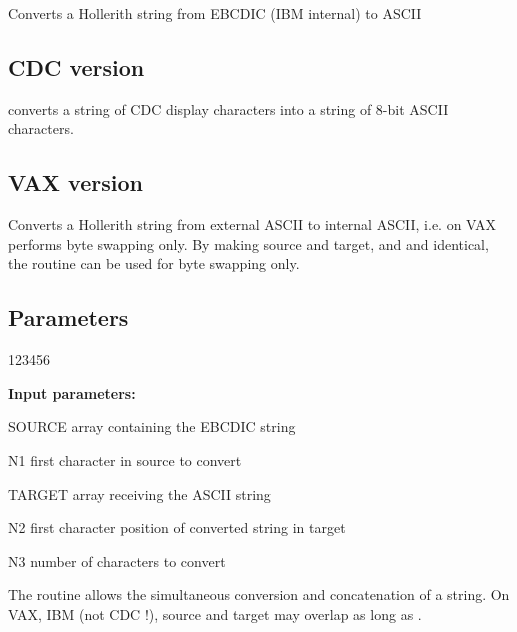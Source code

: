 Converts a Hollerith string from EBCDIC (IBM internal) to ASCII
 
\subsection*{CDC version}
 
 converts a string of CDC display characters
into a string of 8-bit ASCII characters.
 
\subsection*{VAX version}
 
Converts a Hollerith string from external ASCII to internal ASCII,
i.e. on VAX performs byte swapping only. By making source and target,
and  and  identical, 
the routine can be used for byte swapping only.
 
\subsection*{Parameters}

\begin{DLtt}{123456}
\item[{\rm\bf Input parameters:}]
\item[SOURCE] array containing the EBCDIC string
\item[N1]     first character in source to convert
\item[TARGET] array receiving the ASCII string
\item[N2]     first character position of converted string in target
\item[N3]     number of characters to convert
\end{DLtt}
 
The routine allows the simultaneous conversion and
concatenation of a string. 
On VAX, IBM (not CDC !), source and
target may overlap as long as .

